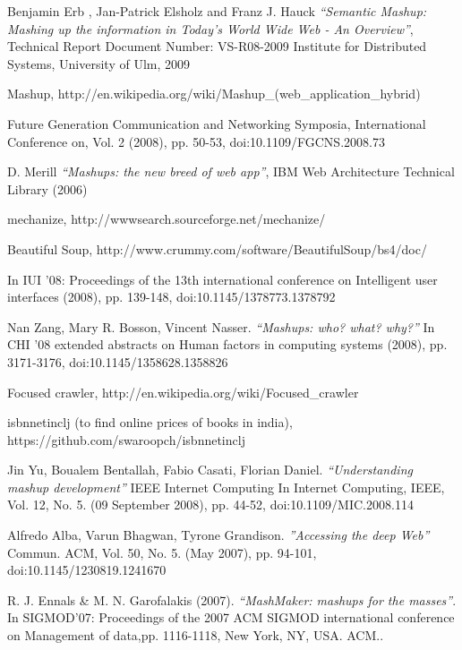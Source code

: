 
\begin{thebibliography}{27}

 Benjamin Erb , Jan-Patrick Elsholz and Franz J. Hauck \emph{``Semantic Mashup: Mashing up the information in Today's World Wide Web - An Overview''}, Technical Report Document Number: VS-R08-2009  Institute for Distributed Systems, University of Ulm, 2009

 Mashup, http://en.wikipedia.org/wiki/Mashup\_(web\_application\_hybrid)

 Future Generation Communication and Networking Symposia, International Conference on, Vol. 2 (2008), pp. 50-53, doi:10.1109/FGCNS.2008.73

 D. Merill \emph{``Mashups: the new breed of web app''}, IBM Web Architecture Technical Library (2006)

 mechanize, http://wwwsearch.sourceforge.net/mechanize/

 Beautiful Soup, http://www.crummy.com/software/BeautifulSoup/bs4/doc/

 In IUI '08: Proceedings of the 13th international conference on Intelligent user interfaces (2008), pp. 139-148, doi:10.1145/1378773.1378792

 Nan Zang, Mary R. Bosson, Vincent Nasser. \emph{``Mashups: who? what? why?''} In CHI '08 extended abstracts on Human factors in computing systems (2008), pp. 3171-3176, doi:10.1145/1358628.1358826

 Focused crawler, http://en.wikipedia.org/wiki/Focused\_crawler

 isbnnetinclj (to find online prices of books in india), https://github.com/swaroopch/isbnnetinclj

 Jin Yu, Boualem Bentallah, Fabio Casati, Florian Daniel. \emph{``Understanding mashup development''} IEEE Internet Computing In Internet Computing, IEEE, Vol. 12, No. 5. (09 September 2008), pp. 44-52, doi:10.1109/MIC.2008.114

 Alfredo Alba, Varun Bhagwan, Tyrone Grandison. \emph{''Accessing the deep Web''} Commun. ACM, Vol. 50, No. 5. (May 2007), pp. 94-101, doi:10.1145/1230819.1241670

  R. J. Ennals \& M. N. Garofalakis (2007). \emph{``MashMaker: mashups for the masses''}. In SIGMOD'07: Proceedings of the 2007 ACM SIGMOD international conference on Management of data,pp. 1116-1118, New York, NY, USA. ACM..


\end{thebibliography}
